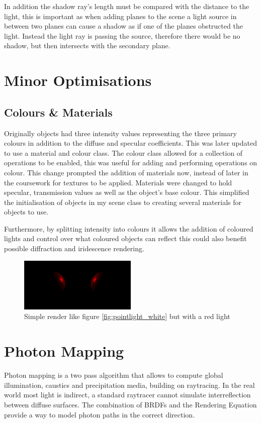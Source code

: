 \documentclass{article}
\begin{document}
In addition the shadow ray's length must be compared with the distance to the light, this is important as when adding planes to the scene a light source in between two planes can cause a shadow as if one of the planes obstructed the light. Instead the light ray is passing the source, therefore there would be no shadow, but then intersects with the secondary plane.

\section{Minor Optimisations}
\subsection{Colours \& Materials}
Originally objects had three intensity values representing the three primary colours in addition to the diffuse and specular coefficients. This was later updated to use a material and colour class. The colour class allowed for a collection of operations to be enabled, this was useful for adding and performing operations on colour. This change prompted the addition of materials now, instead of later in the coursework for textures to be applied. Materials were changed to hold specular, transmission values as well as the object’s base colour. This simplified the initialisation of objects in my scene class to creating several materials for objects to use.

Furthermore, by splitting intensity into colours it allows the addition of coloured lights and control over what coloured objects can reflect this could also benefit possible diffraction and iridescence rendering.
\begin{figure}[h]
\centering
\includegraphics[width=0.5\textwidth]{pointlight_redlight}
\captionsetup{justification=centering,margin=0.5cm}
\caption{Simple render like figure \ref{fig:pointlight_white} but with a red light}
\label{fig:pointlight_red}
\end{figure}

\section{Photon Mapping}
Photon mapping is a two pass algorithm that allows to compute global illumination, caustics and precipitation media, building on raytracing. In the real world most light is indirect, a standard raytracer cannot simulate interreflection between diffuse surfaces. The combination of BRDFs and the Rendering Equation provide a way to model photon paths in the correct direction.
\end{document}
